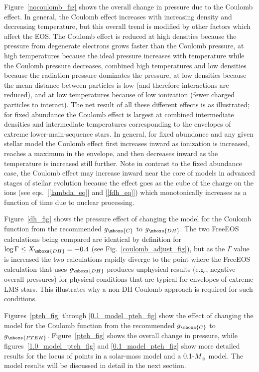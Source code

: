 Figure~\ref{nocoulomb_fig} shows the overall change in pressure due to the
Coulomb effect.  In general, the Coulomb effect increases with increasing
density and decreasing temperature, but this overall trend is modified by
other factors which affect the EOS. The Coulomb effect is reduced at high
densities because the pressure from degenerate electrons grows faster than
the Coulomb pressure, at high temperatures because the ideal pressure
increases with temperature while the Coulomb pressure decreases, combined
high temperatures and low densities because the radiation pressure dominates
the pressure, at low densities because the mean distance between particles
is low (and therefore interactions are reduced), and at low temperatures
because of low ionization (fewer charged particles to interact). The net
result of all these different effects is as illustrated; for fixed abundance
the Coulomb effect is largest at combined intermediate densities and
intermediate temperatures corresponding to the envelopes of extreme
lower-main-sequence stars. In general, for fixed abundance and any given
stellar model the Coulomb effect first increases inward as ionization is
increased, reaches a maximum in the envelope, and then decreases inward as
the temperature is increased still further.  Note in contrast to the fixed
abundance case, the Coulomb effect may increase inward near the core of
models in advanced stages of stellar evolution because the effect goes as
the cube of the charge on the ions (see eqs.~[\ref{lambda_eq}] and
[\ref{fdh_eq}]) which monotonically increases as a function of time due to
nuclear processing.

Figure~\ref{dh_fig} shows the pressure effect of changing the model for the
Coulomb function from the recommended $g_{\mboxs{C}}$ to $g_{\mboxs{DH}}$.
The two FreeEOS calculations being compared are identical by definition for
$\log \Gamma \le X_{\mboxs{DH}} = -0.4$ (see Fig.~\ref{coulomb_adjust_fig}),
but as the $\Gamma$ value is increased the two calculations rapidly diverge
to the point where the FreeEOS calculation that uses $g_{\mboxs{DH}}$
produces unphysical results (e.g., negative overall pressures) for physical
conditions that are typical for envelopes of extreme LMS stars. This
illustrates why a non-DH Coulomb approach is required for such conditions.

Figures~\ref{pteh_fig} through \ref{0.1_model_pteh_fig} show the effect of
changing the model for the Coulomb function from the recommended
$g_{\mboxs{C}}$ to $g_{\mboxs{PTEH}}$.  Figure~\ref{pteh_fig} shows the
overall change in pressure, while figures~\ref{1.0_model_pteh_fig} and
\ref{0.1_model_pteh_fig} show more detailed results for the locus of points
in a solar-mass model and a 0.1-$M_\sun$ model.  The model results will be
discussed in detail in the next section.


